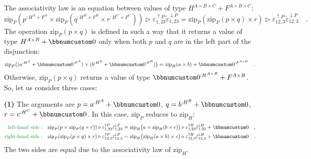 The associativity law is an equation between values of type $H^{A\times B\times C}+F^{A\times B\times C}$:
\[
\text{zip}_{P}(p^{:H^{A}+F^{A}}\times\text{zip}_{P}(q^{:H^{B}+F^{B}}\times r^{:H^{C}+F^{C}}))\triangleright\varepsilon_{1,23}^{\uparrow P}\tilde{\varepsilon}_{1,23}^{\downarrow P}=\text{zip}_{P}(\text{zip}_{P}(p\times q)\times r)\triangleright\varepsilon_{12,3}^{\uparrow P}\tilde{\varepsilon}_{12,3}^{\downarrow P}\quad.
\]
The operation $\text{zip}_{P}(p\times q)$ is defined in such a way
that it returns a value of type $H^{A\times B}+\bbnum 0$ only when
both $p$ and $q$ are in the left part of the disjunction:
\[
\text{zip}_{P}\big((a^{:H^{A}}+\bbnum 0^{:F^{A}})\times(b^{:H^{B}}+\bbnum 0^{:F^{B}})\big)=\text{zip}_{H}(a\times b)+\bbnum 0^{:F^{A\times B}}\quad.
\]
Otherwise, $\text{zip}_{P}(p\times q)$ returns a value of type $\bbnum 0^{:H^{A\times B}}+F^{A\times B}$.
So, let us consider three cases:

\textbf{(1)} The arguments are $p=a^{:H^{A}}+\bbnum 0$, $q=b^{:H^{B}}+\bbnum 0$,
$r=c^{:H^{C}}+\bbnum 0$. In this case, $\text{zip}_{P}$ reduces
to $\text{zip}_{H}$:
\begin{align*}
{\color{greenunder}\text{left-hand side}:}\quad & \text{zip}_{P}(p\times\text{zip}_{P}(q\times r))\triangleright\varepsilon_{1,23}^{\uparrow P}\tilde{\varepsilon}_{1,23}^{\downarrow P}=\text{zip}_{H}\big(a\times\text{zip}_{H}(b\times c)\big)\triangleright\varepsilon_{1,23}^{\uparrow H}\tilde{\varepsilon}_{1,23}^{\downarrow H}+\bbnum 0\quad,\\
{\color{greenunder}\text{right-hand side}:}\quad & \text{zip}_{P}(\text{zip}_{P}(p\times q)\times r)\triangleright\varepsilon_{12,3}^{\uparrow P}\tilde{\varepsilon}_{12,3}^{\downarrow P}=\text{zip}_{H}\big(\text{zip}_{H}(a\times b)\times c\big)\triangleright\varepsilon_{12,3}^{\uparrow H}\tilde{\varepsilon}_{12,3}^{\downarrow H}+\bbnum 0\quad.
\end{align*}
The two sides are equal due to the associativity law of $\text{zip}_{H}$.


